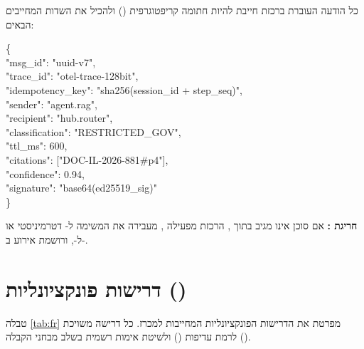 \begin{contractbox}
כל הודעה העוברת ברכזת חייבת להיות חתומה קריפטוגרפית () ולהכיל את השדות המחייבים הבאים:
\begin{ltrblock}
\ttfamily\footnotesize\color{CSNavy}
\{\\
\hspace*{1em}"msg\_id": "uuid-v7",\\
\hspace*{1em}"trace\_id": "otel-trace-128bit",\\
\hspace*{1em}"idempotency\_key": "sha256(session\_id + step\_seq)",\\
\hspace*{1em}"sender": "agent.rag",\\
\hspace*{1em}"recipient": "hub.router",\\
\hspace*{1em}"classification": "RESTRICTED\_GOV",\\
\hspace*{1em}"ttl\_ms": 600,\\
\hspace*{1em}"citations": ["DOC-IL-2026-881\#p4"],\\
\hspace*{1em}"confidence": 0.94,\\
\hspace*{1em}"signature": "base64(ed25519\_sig)"\\
\}
\end{ltrblock}
\textbf{חריגת :} אם סוכן אינו מגיב בתוך , הרכזת מפעילה , מעבירה את המשימה ל- דטרמיניסטי או ל-, ורושמת אירוע ב-.
\end{contractbox}

\section{דרישות פונקציונליות ()}
\label{sec:fr}

טבלה \ref{tab:fr} מפרטת את הדרישות הפונקציונליות המחייבות למכרז. כל דרישה משויכת לרמת עדיפות () ולשיטת אימות רשמית בשלב מבחני הקבלה ().

